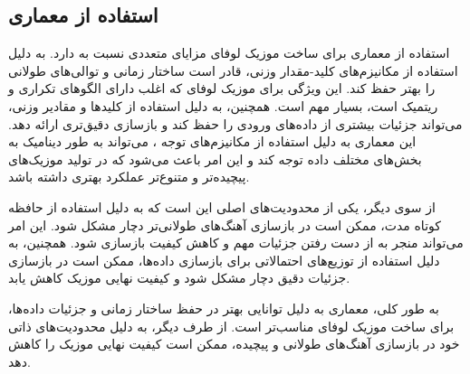 \subsection{استفاده از معماری }

استفاده از معماری  برای ساخت موزیک لوفای مزایای متعددی نسبت به   دارد.  به دلیل استفاده از مکانیزم‌های کلید-مقدار وزنی، قادر است ساختار زمانی و توالی‌های طولانی را بهتر حفظ کند. این ویژگی برای موزیک لوفای که اغلب دارای الگوهای تکراری و ریتمیک است، بسیار مهم است. همچنین،  به دلیل استفاده از کلیدها و مقادیر وزنی، می‌تواند جزئیات بیشتری از داده‌های ورودی را حفظ کند و بازسازی دقیق‌تری ارائه دهد. این معماری به دلیل استفاده از مکانیزم‌های توجه ، می‌تواند به طور دینامیک به بخش‌های مختلف داده توجه کند و این امر باعث می‌شود که در تولید موزیک‌های پیچیده‌تر و متنوع‌تر عملکرد بهتری داشته باشد.

از سوی دیگر، یکی از محدودیت‌های اصلی  این است که به دلیل استفاده از حافظه کوتاه مدت، ممکن است در بازسازی آهنگ‌های طولانی‌تر دچار مشکل شود. این امر می‌تواند منجر به از دست رفتن جزئیات مهم و کاهش کیفیت بازسازی شود. همچنین،  به دلیل استفاده از توزیع‌های احتمالاتی برای بازسازی داده‌ها، ممکن است در بازسازی جزئیات دقیق دچار مشکل شود و کیفیت نهایی موزیک کاهش یابد.

به طور کلی، معماری  به دلیل توانایی بهتر در حفظ ساختار زمانی و جزئیات داده‌ها، برای ساخت موزیک لوفای مناسب‌تر است. از طرف دیگر،  به دلیل محدودیت‌های ذاتی خود در بازسازی آهنگ‌های طولانی و پیچیده، ممکن است کیفیت نهایی موزیک را کاهش دهد.

